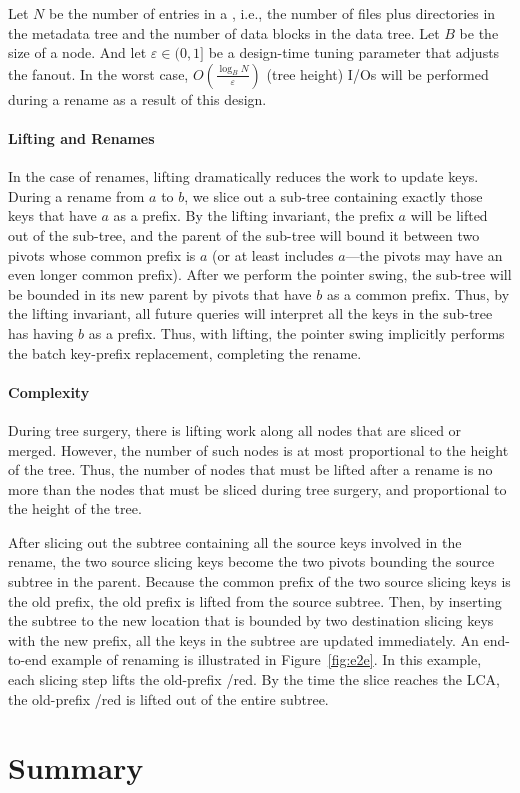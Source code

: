 Let $N$ be the number of entries in a \bet, i.e., the number of files plus
directories in the metadata tree and the number of data blocks in the data tree.
Let $B$ be the size of a node.
And let $\varepsilon\in(0,1]$ be a design-time tuning parameter that adjusts the
fanout.
In the worst case, $O(\frac{\log_B{N}}{\varepsilon})$ (tree height)
I/Os will be performed  during a rename as a result of this design.


\paragraph{Lifting and Renames}
In the case of renames, lifting dramatically reduces the work to update
keys.  During a rename from $a$ to $b$, we slice out a sub-tree
containing exactly those keys that have $a$ as a prefix.  By the
lifting invariant, the prefix $a$ will be lifted out of the sub-tree,
and the parent of the sub-tree will bound it between two pivots whose
common prefix is $a$ (or at least includes $a$---the pivots may have
an even longer common prefix).  After we perform the pointer swing,
the sub-tree will be bounded in its new parent by pivots that have $b$
as a common prefix.  Thus, by the lifting invariant, all future queries
will interpret all the keys in the sub-tree has having $b$ as a prefix.
Thus, with lifting, the pointer swing implicitly performs the batch key-prefix
replacement, completing the rename.

\paragraph{Complexity} During tree surgery, there is lifting work
along all nodes that are sliced or merged.  However, the number of
such nodes is at most proportional to the height of the tree.
Thus, the number of nodes that must be lifted after a rename is no more than
the nodes that must be sliced during tree surgery, and proportional to the height
of the tree.

After slicing out the subtree containing all the source keys involved in the rename,
the two source slicing keys become the two pivots bounding the source subtree in the
parent.
Because the common prefix of the two source slicing keys is the old prefix,
the old prefix is lifted from the source subtree.
Then, by inserting the subtree
to the new location that is bounded by two destination slicing keys with the new prefix,
all the keys in the subtree are updated immediately.
An end-to-end example of renaming is illustrated in Figure~\ref{fig:e2e}.
In this example, each slicing step lifts the old-prefix /red. By the time the slice reaches the LCA,
the old-prefix /red is lifted out of the entire subtree.

\section{Summary}

